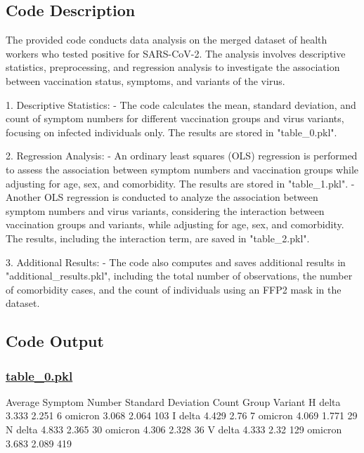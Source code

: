 \documentclass[11pt]{article}
\begin{document}
\subsection{Code Description}

The provided code conducts data analysis on the merged dataset of health workers who tested positive for SARS-CoV-2. The analysis involves descriptive statistics, preprocessing, and regression analysis to investigate the association between vaccination status, symptoms, and variants of the virus. 

1. Descriptive Statistics:
   - The code calculates the mean, standard deviation, and count of symptom numbers for different vaccination groups and virus variants, focusing on infected individuals only. The results are stored in "table\_0.pkl".

2. Regression Analysis:
   - An ordinary least squares (OLS) regression is performed to assess the association between symptom numbers and vaccination groups while adjusting for age, sex, and comorbidity. The results are stored in "table\_1.pkl".
   - Another OLS regression is conducted to analyze the association between symptom numbers and virus variants, considering the interaction between vaccination groups and variants, while adjusting for age, sex, and comorbidity. The results, including the interaction term, are saved in "table\_2.pkl".

3. Additional Results:
   - The code also computes and saves additional results in "additional\_results.pkl", including the total number of observations, the number of comorbidity cases, and the count of individuals using an FFP2 mask in the dataset.

\subsection{Code Output}\hypertarget{file-table-0-pkl}{}

\subsubsection*{\hyperlink{code-Data Analysis-table-0-pkl}{table\_0.pkl}}

\begin{codeoutput}
               Average Symptom Number  Standard Deviation  Count
Group Variant                                                   
H     delta                     3.333               2.251      6
      omicron                   3.068               2.064    103
I     delta                     4.429                2.76      7
      omicron                   4.069               1.771     29
N     delta                     4.833               2.365     30
      omicron                   4.306               2.328     36
V     delta                     4.333                2.32    129
      omicron                   3.683               2.089    419
\end{codeoutput}\hypertarget{file-table-1-pkl}{}
\end{document}
